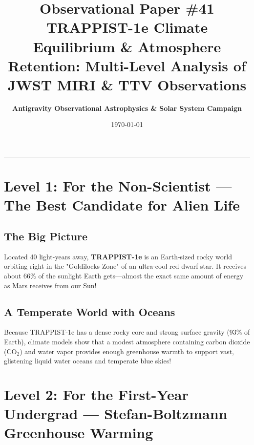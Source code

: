 \documentclass[11pt,a4paper]{article}
\title{\Huge \textbf{Observational Paper \#41}\\ \Large TRAPPIST-1e Climate Equilibrium \& Atmosphere Retention: Multi-Level Analysis of JWST MIRI \& TTV Observations}
\author{\textbf{Antigravity Observational Astrophysics \& Solar System Campaign}}
\date{\today}
\begin{document}
\maketitle

\vspace{-1em}
\begin{center}
\rule{\textwidth}{1.5pt}
\end{center}

\section*{Level 1: For the Non-Scientist — The Best Candidate for Alien Life}

\subsection*{The Big Picture}
Located 40 light-years away, \textbf{TRAPPIST-1e} is an Earth-sized rocky world orbiting right in the "Goldilocks Zone" of an ultra-cool red dwarf star. It receives about $66\%$ of the sunlight Earth gets—almost the exact same amount of energy as Mars receives from our Sun!

\subsection*{A Temperate World with Oceans}
Because TRAPPIST-1e has a dense rocky core and strong surface gravity ($93\%$ of Earth), climate models show that a modest atmosphere containing carbon dioxide ($\mathrm{CO_2}$) and water vapor provides enough greenhouse warmth to support vast, glistening liquid water oceans and temperate blue skies!

\newpage

\section*{Level 2: For the First-Year Undergrad — Stefan-Boltzmann Greenhouse Warming}
\end{document}
